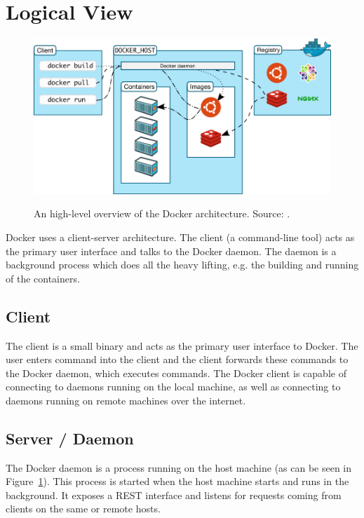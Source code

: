 
\section{Logical View}
\label{sec:viewlogical}


\begin{figure}[H]
\caption{An high-level overview of the Docker architecture. Source: \cite{dockerarchi}.}
\centering
\includegraphics[scale=0.4]{4-softwarearch/images/architecture.png}
\label{fig:dockerarchipic}
\end{figure}
Docker uses a client-server architecture. The client (a command-line tool) acts as the primary user interface and talks to the Docker daemon. The daemon is a background process which does all the heavy lifting, e.g. the building and running of the containers.

\subsection{Client}
The client is a small binary and acts as the primary user interface to Docker. The user enters command into the client and the client forwards these commands to the Docker daemon, which executes commands.
The Docker client is capable of connecting to daemons running on the local machine, as well as connecting to daemons running on remote machines over the internet.

\subsection{Server / Daemon}
The Docker daemon is a process running on the host machine (as can be seen in Figure~\ref{fig:dockerarchipic}). This process is started when the host machine starts and runs in the background. It exposes a REST interface and listens for requests coming from clients on the same or remote hosts.

